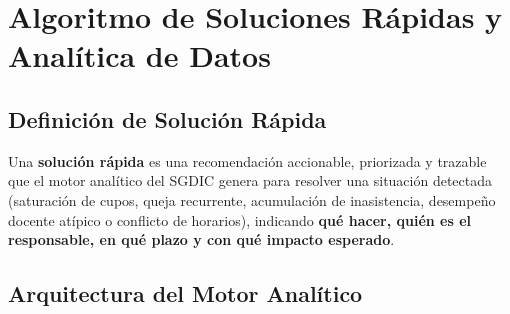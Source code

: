 \chapter{Algoritmo de Soluciones Rápidas y Analítica de Datos}
\label{ch:algoritmo}

\section{Definición de Solución Rápida}

\begin{cajaAlgoritmo}[Definición]
Una \textbf{solución rápida} es una recomendación accionable, priorizada y
trazable que el motor analítico del \ac{SGDIC} genera para resolver una
situación detectada (saturación de cupos, queja recurrente, acumulación de
inasistencia, desempeño docente atípico o conflicto de horarios), indicando
\textbf{qué hacer, quién es el responsable, en qué plazo y con qué impacto
esperado}.
\end{cajaAlgoritmo}

\section{Arquitectura del Motor Analítico}

